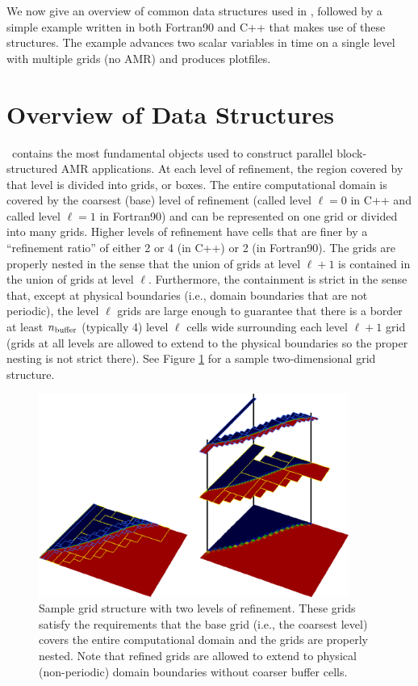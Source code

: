 We now give an overview of common data structures used in \BoxLib, followed by a simple
example written in both Fortran90 and C++ that makes use of these structures.
The example advances two scalar variables in time on a single level with multiple 
grids (no AMR) and produces plotfiles.

\section{Overview of Data Structures}

\BoxLib\ contains the most fundamental objects used to construct parallel
block-structured AMR applications.
At each level of refinement, the region covered by that level is divided
into grids, or boxes.  The entire computational domain is covered by
the coarsest (base) level of refinement (called level $\ell=0$ in C++ 
and called level $\ell=1$ in Fortran90) and can be represented on one
grid or divided into many grids.
Higher levels of refinement have cells that are finer by a ``refinement ratio''
of either 2 or 4 (in C++) or 2 (in Fortran90).  The grids are properly nested in the sense that the union 
of grids at level $\ell+1$ is contained in the union of grids at level $\ell$.
Furthermore, the containment is strict in the sense that, except at physical 
boundaries (i.e., domain boundaries that are not periodic),
the level $\ell$ grids are large enough to guarantee that there is
a border at least $n_{\rm buffer}$ (typically 4) level $\ell$ cells wide surrounding each level
$\ell +1$ grid (grids at all levels are allowed to extend to the physical
boundaries so the proper nesting is not strict there).  See Figure \ref{fig:AMR}
for a sample two-dimensional grid structure.\\
\begin{figure}[htb]
\centering
\includegraphics[width=4in]{./Introduction/AMR}
\caption{\label{fig:AMR}Sample grid structure with two levels of refinement.  These
grids satisfy the requirements that the base grid (i.e., the coarsest level)
covers the entire computational domain 
and the grids are properly nested.  Note that refined grids are allowed to extend to physical
(non-periodic) domain boundaries without coarser buffer cells.}
\end{figure}

